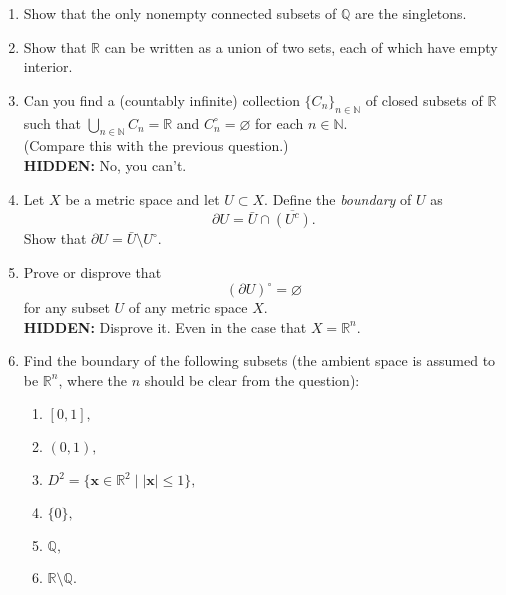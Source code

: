 \documentclass[12pt]{article}
\theoremstyle{definition}
\numberwithin{thm}{section}
\let\emptyset\varnothing
\newcommand{\hint}[1]{\textbf{HIDDEN:} {\color[rgb]{0.95, 0.95, 0.95}#1}}
\begin{document}
\begin{enumerate}
\begin{enumerate}
		\item Give an example of a compact subset of $\mathbb{Q}$ which is not connected.\\
		\hint{One such is $\{0\} \cup \left\{n^{-1} : n \in \mathbb{N}\right\}.$}
		\item Can you give an example of a connected subset of $\mathbb{Q}$ which is not compact?\\
		\hint{The next question might be helpful.}
	\end{enumerate}
	\item Show that the only nonempty connected subsets of $\mathbb{Q}$ are the singletons.
	\item Show that $\mathbb{R}$ can be written as a union of two sets, each of which have empty interior.
	\item Can you find a (countably infinite) collection $\{C_n\}_{n \in \mathbb{N}}$ of closed subsets of $\mathbb{R}$ such that $\displaystyle\bigcup_{n \in \mathbb{N}}C_n = \mathbb{R}$ and $C_n^\circ = \emptyset$ for each $n \in \mathbb{N}.$ \\
	(Compare this with the previous question.)\\
	\hint{No, you can't.}
	\item Let $X$ be a metric space and let $U \subset X.$ Define the \emph{boundary} of $U$ as 
	\begin{equation*} 
		\partial U = \bar{U} \cap \overline{(U^c)}.
	\end{equation*}
	Show that $\partial U = \bar{U} \setminus U^\circ.$
	\item Prove or disprove that
	\begin{equation*} 
		(\partial U)^\circ = \emptyset
	\end{equation*}
	for any subset $U$ of any metric space $X.$\\
	\hint{Disprove it. Even in the case that $X = \mathbb{R}^n.$}
	\item Find the boundary of the following subsets (the ambient space is assumed to be $\mathbb{R}^n$, where the $n$ should be clear from the question):
	\begin{enumerate}
		\item $[0, 1],$
		\item $(0, 1),$
		\item $D^2 = \{\mathbf{x} \in \mathbb{R}^2 \mid \left|\mathbf{x}\right| \le 1\},$
		\item $\{0\},$
		\item $\mathbb{Q},$
		\item $\mathbb{R}\setminus\mathbb{Q}.$

\end{enumerate}
\end{enumerate}
\end{document}
